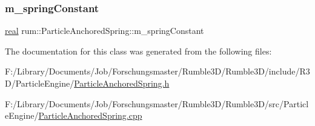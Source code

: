 \mbox{\label{classrum_1_1_particle_anchored_spring_a1f5b5cc0af0815b1d7d9902c515f9ed8}} 
\subsubsection{\texorpdfstring{m\+\_\+spring\+Constant}{m\_springConstant}}
{\footnotesize\ttfamily \hyperlink{namespacerum_a7e8cca23573d5eaead0f138cbaa4862c}{real} rum\+::\+Particle\+Anchored\+Spring\+::m\+\_\+spring\+Constant\hspace{0.3cm}{\ttfamily [protected]}}



The documentation for this class was generated from the following files\+:\begin{DoxyCompactItemize}
\item 
F\+:/\+Library/\+Documents/\+Job/\+Forschungsmaster/\+Rumble3\+D/\+Rumble3\+D/include/\+R3\+D/\+Particle\+Engine/\hyperlink{_particle_anchored_spring_8h}{Particle\+Anchored\+Spring.\+h}\item 
F\+:/\+Library/\+Documents/\+Job/\+Forschungsmaster/\+Rumble3\+D/\+Rumble3\+D/src/\+Particle\+Engine/\hyperlink{_particle_anchored_spring_8cpp}{Particle\+Anchored\+Spring.\+cpp}\end{DoxyCompactItemize}

